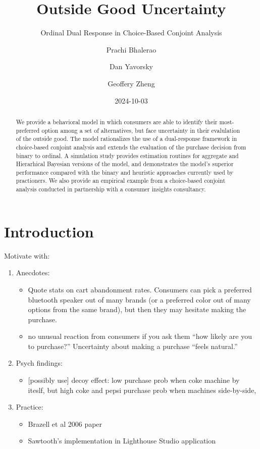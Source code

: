 \documentclass[
  letterpaper,
  DIV=11,
  numbers=noendperiod]{scrartcl}
\title{Outside Good Uncertainty}
\subtitle{Ordinal Dual Response in Choice-Based Conjoint Analysis}
\author{Prachi Bhalerao \and Dan Yavorsky \and Geoffery Zheng}
\date{2024-10-03}
\providecommand{\tightlist}{%
  \setlength{\itemsep}{0pt}\setlength{\parskip}{0pt}}\usepackage{longtable,booktabs,array}
\begin{document}
\maketitle
\begin{abstract}
We provide a behavioral model in which consumers are able to identify
their most-preferred option among a set of alternatives, but face
uncertainty in their evalulation of the outside good. The model
rationalizes the use of a dual-response framework in choice-based
conjoint analysis and extends the evaluation of the purchase decision
from binary to ordinal. A simulation study provides estimation routines
for aggregate and Hierarhical Bayesian versions of the model, and
demonstrates the model's superior performance compared with the binary
and heuristic approaches currently used by practioners. We also provide
an empirical example from a choice-based conjoint analysis conducted in
partnership with a consumer insights consultancy.
\end{abstract}


  \newcommand{\x}{\mathbf{x}}
  \newcommand{\bfbeta}{\boldsymbol{\beta}}
  \newcommand{\iid}{\stackrel{iid}{\sim}}

\section{Introduction}\label{sec-intro}

Motivate with:

\begin{enumerate}
\def\labelenumi{\arabic{enumi}.}
\item
  Anecdotes:

  \begin{itemize}
  \tightlist
  \item
    Quote stats on cart abandonment rates. Consumers can pick a
    preferred bluetooth speaker out of many brands (or a preferred color
    out of many options from the same brand), but then they may hesitate
    making the purchase.
  \item
    no unusual reaction from consumers if you ask them ``how likely are
    you to purchase?'' Uncertainty about making a purchase ``feels
    natural.''
  \end{itemize}
\item
  Psych findings:

  \begin{itemize}
  \tightlist
  \item
    {[}possibly use{]} decoy effect: low purchase prob when coke machine
    by iteslf, but high coke and pepsi purchase prob when machines
    side-by-side,
  \end{itemize}
\item
  Practice:

  \begin{itemize}
  \tightlist
  \item
    Brazell et al 2006 paper
  \item
    Sawtooth's implementation in Lighthouse Studio application
  \end{itemize}
\end{enumerate}
\end{document}
